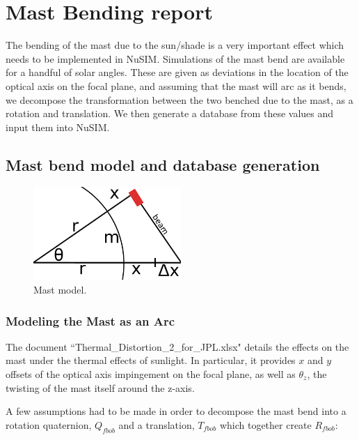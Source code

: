 %

\chapter{Mast Bending report}
The bending of the mast due to the sun/shade is a very important effect which needs to be implemented in NuSIM. Simulations of the mast bend are available for a handful of solar angles. These are given as deviations in the location of the optical axis on the focal plane, and assuming that the mast will arc as it bends, we decompose the transformation between the two benched due to the mast, as a rotation and translation. We then generate a database from these values and input them into NuSIM.

\section{Mast bend model and database generation}

\begin{figure}[tb]
\begin{center}
\includegraphics[width=0.5\textwidth]{images/mast_bending_model.png}
\caption{Mast model.}
\label{mastmodel}
\end{center}
\end{figure}

\subsection{Modeling the Mast as an Arc}

The document ``Thermal\_Distortion\_2\_for\_JPL.xlsx" details the effects on the mast under the thermal effects of sunlight. In particular, it provides $x$ and $y$ offsets of the optical axis impingement on the focal plane, as well as $\theta_z$, the twisting of the mast itself around the z-axis. 

A few assumptions had to be made in order to decompose the mast bend into a rotation quaternion, $Q_{fbob}$ and a translation, $T_{fbob}$ which together create $R_{fbob}$:

